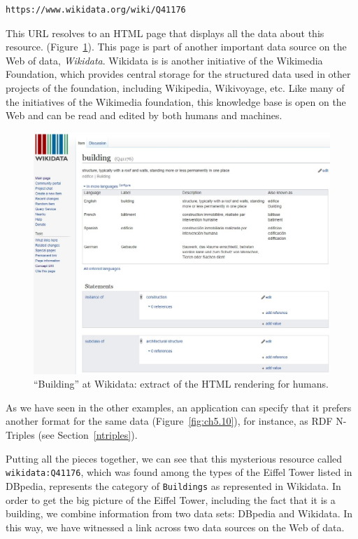\begin{lstlisting}
https://www.wikidata.org/wiki/Q41176
\end{lstlisting}


This URL resolves to an HTML page that displays all the data about this
resource.   
(Figure~\ref{fig:ch5.9}). This page is part of another important  data source on the Web of data, 
\emph{Wikidata}. Wikidata is  is another initiative of the Wikimedia Foundation, which provides 
central storage for the structured data used in other projects of the
foundation,  including Wikipedia, Wikivoyage, etc.  Like many of the initiatives of the Wikimedia foundation, this knowledge
base is open on the Web and can be read and edited by both humans and
machines.

\begin{figure}
    \centering
    \includegraphics[width=5.0in]{media/ch5/figure-05-09.jpg}
    \caption{``Building'' at Wikidata: extract of the HTML rendering for humans.}
    \label{fig:ch5.9}
\end{figure}

As we have seen in the other examples, an application can specify that it prefers  another format for 
the same data (Figure~\ref{fig:ch5.10}), for
instance,  as  RDF N-Triples (see Section~\ref{ntriples}).  

Putting  all the pieces
together, we can see that this mysterious resource called \texttt{wikidata:Q41176},
which  was found among the types of the Eiffel Tower listed in DBpedia, represents the
category of \texttt{Buildings} as represented in  Wikidata.   
In order to get the big picture of the Eiffel Tower, 
including the fact that it is a building, we combine information from two data sets: DBpedia and Wikidata. 
In this way, we have
witnessed a link across two data sources on the Web of data.

